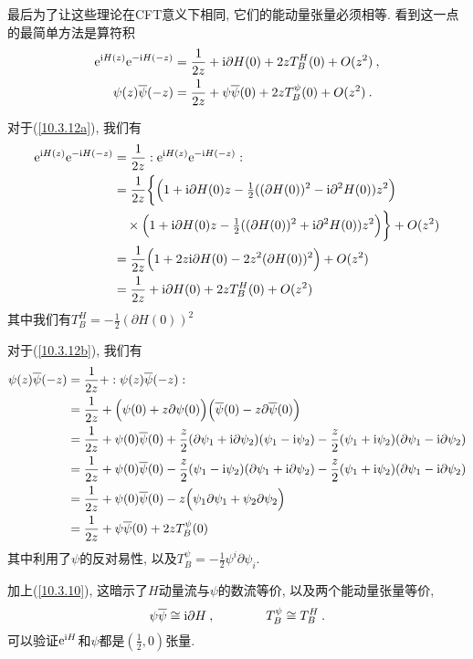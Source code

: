 最后为了让这些理论在CFT意义下相同, 它们的能动量张量必须相等. 看到这一点的最简单方法是算符积
\begin{subequations}
\begin{align}
    \mathrm{e}^{\mathrm{i} H(z)}\mathrm{e}^{-\mathrm{i} H(-z)} &= \frac{1}{2z} + \mathrm{i}\partial H(0)+2zT_{B}^{H}(0)+O(z^{2})\:, \label{10.3.12a} \\
    \psi(z)\overline{\psi}(-z) &= \frac{1}{2z} + \psi\overline{\psi}(0) +2zT_{B}^{\psi}(0) + O(z^{2}) \:. \label{10.3.12b}
\end{align} \label{10.3.12}
\end{subequations}
\begin{tcolorbox}
对于(\ref{10.3.12a}), 我们有
\begin{align*}
    \mathrm{e}^{\mathrm{i} H(z)}\mathrm{e}^{-\mathrm{i} H(-z)} &= \frac{1}{2z} :  \mathrm{e}^{\mathrm{i} H(z)}\mathrm{e}^{-\mathrm{i} H(-z)} : \\
    &= \frac{1}{2z} \biggl\{ \Bigl(1+\mathrm{i}\partial H(0)z-\tfrac{1}{2}((\partial H(0))^{2} -\mathrm{i} \partial^{2} H(0))z^{2}\Bigr)\\
    &\quad\times\Bigl(1+\mathrm{i}\partial H(0)z-\tfrac{1}{2}((\partial H(0))^{2} +\mathrm{i} \partial^{2} H(0))z^{2}\Bigr) \biggr\}
    +O(z^{2}) \\
    & =\frac{1}{2z}\Bigl(1+ 2z\mathrm{i}\partial H(0)-2z^{2}(\partial H(0))^{2}\Bigr)+O(z^{2}) \\
    &=\frac{1}{2z} + \mathrm{i}\partial H(0)+2zT_{B}^{H}(0)+O(z^{2})
\end{align*} 
其中我们有$T_{B}^{H}=-\tfrac{1}{2}(\partial H(0))^{2}$

对于(\ref{10.3.12b}), 我们有
\begin{align*}
    \psi(z)\overline{\psi}(-z) &= \frac{1}{2z} + :\psi(z)\overline{\psi}(-z) : \\
    &= \frac{1}{2z} + \Bigl(\psi(0)+z\partial\psi(0)\Bigr) \Bigl(\overline{\psi}(0)-z\partial\overline{\psi}(0)\Bigr) \\
    &=\frac{1}{2z} +\psi(0)\overline{\psi}(0) +\frac{z}{2}(\partial\psi_{1}+\mathrm{i}\partial\psi_{2})(\psi_{1}-\mathrm{i}\psi_{2})
    -\frac{z}{2}(\psi_{1}+\mathrm{i}\psi_{2})(\partial\psi_{1}-\mathrm{i}\partial\psi_{2})\\
    &=\frac{1}{2z} +\psi(0)\overline{\psi}(0)-\frac{z}{2}(\psi_{1}-\mathrm{i}\psi_{2})(\partial\psi_{1}+\mathrm{i}\partial\psi_{2})
    -\frac{z}{2}(\psi_{1}+\mathrm{i}\psi_{2})(\partial\psi_{1}-\mathrm{i}\partial\psi_{2}) \\
    &= \frac{1}{2z} +\psi(0)\overline{\psi}(0)- z\Bigl(\psi_{1}\partial\psi_{1}+\psi_{2}\partial\psi_{2}\Bigr) \\
    &=\frac{1}{2z} + \psi\overline{\psi}(0) +2zT_{B}^{\psi}(0) 
\end{align*}
其中利用了$\psi$的反对易性, 以及$T_{B}^{\psi}=-\frac{1}{2}\psi^{i}\partial\psi_{i}$.
\end{tcolorbox}
加上(\ref{10.3.10}), 这暗示了$ H $动量流与$ \psi $的数流等价, 以及两个能动量张量等价,
\begin{equation}
    \psi\overline{\psi}\cong \mathrm{i}\partial H\:, \qquad \qquad 
    T_{B}^{\psi}\cong T_{B}^{H} \:. \label{10.3.13}
\end{equation}
可以验证$ \mathrm{e}^{\mathrm{i} H} $和$ \psi $都是$(\frac{1}{2},0)$张量.

